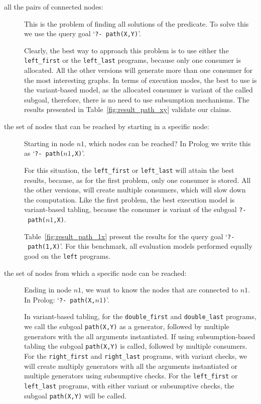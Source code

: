 \begin{description}
   \item[all the pairs of connected nodes:] This is the problem of finding all solutions of the predicate.
   To solve this we use the query goal `\texttt{?-~path(X,Y)}'.
   
   Clearly, the best way to approach this problem is to use either the \texttt{left\_first} or
   the \texttt{left\_last} programs, because only one consumer is allocated. All the other
   versions will generate more than one consumer for the most interesting graphs.
   In terms of execution modes, the best to use is the variant-based model, as the allocated consumer
   is variant of the called subgoal, therefore, there is no need to use subsumption mechanisms.
   The results presented in Table~\ref{fig:result_path_xy} validate our claims.
   
   
   
   \item[the set of nodes that can be reached by starting in a specific node:] Starting in node $n1$, which
   nodes can be reached? In Prolog we write this as `\texttt{?-~path($n1$,X)}'.
   
   For this situation, the \texttt{left\_first} or \texttt{left\_last} will attain the best results,
   because, as for the first problem, only one consumer is stored. All the other versions, will create
   multiple consumers, which will slow down the computation. Like the first problem, the best execution
   model is variant-based tabling, because the consumer is variant of the subgoal \texttt{?-~path($n1$,X)}.
   
   Table~\ref{fig:result_path_1x} present the results for the query goal `\texttt{?-~path(1,X)}'.
   For this benchmark, all evaluation models performed equally good on the \texttt{left} programs.
   
   
   
   \item[the set of nodes from which a specific node can be reached:] Ending in node $n1$,
   we want to know the nodes that are connected to $n1$. In Prolog: `\texttt{?-~path(X,$n1$)}'.
   
   In variant-based tabling, for the \texttt{double\_first} and \texttt{double\_last} programs, we call the
   subgoal \texttt{path(X,Y)} as a generator, followed by multiple generators with the all arguments instantiated.
   If using subsumption-based tabling the subgoal \texttt{path(X,Y)} is called, followed by multiple consumers.
   For the \texttt{right\_first} and \texttt{right\_last} programs, with variant checks, we will create multiply
   generators with all the arguments instantiated or multiple generators using subsumptive checks.
   For the \texttt{left\_first} or \texttt{left\_last} programs, with either variant or subsumptive checks,
   the subgoal \texttt{path(X,Y)} will be called.
   

\end{description}
